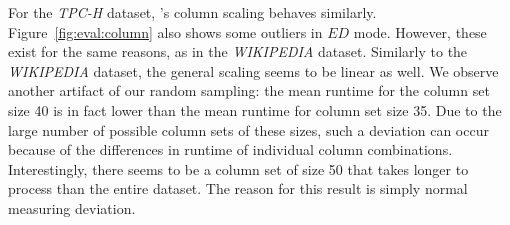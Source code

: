 
For the \emph{TPC-H} dataset, \sawfish's column scaling behaves similarly.
Figure~\ref{fig:eval:column} also shows some outliers in $ED$ mode.
However, these exist for the same reasons, as in the \emph{WIKIPEDIA} dataset.
Similarly to the \emph{WIKIPEDIA} dataset, the general scaling seems to be linear as well.
We observe another artifact of our random sampling: the mean runtime for the column set size 40 is in fact lower than the mean runtime for column set size 35.
Due to the large number of possible column sets of these sizes, such a deviation can occur because of the differences in runtime of individual column combinations.
Interestingly, there seems to be a column set of size 50 that takes longer to process than the entire dataset.
The reason for this result is simply normal measuring deviation.

